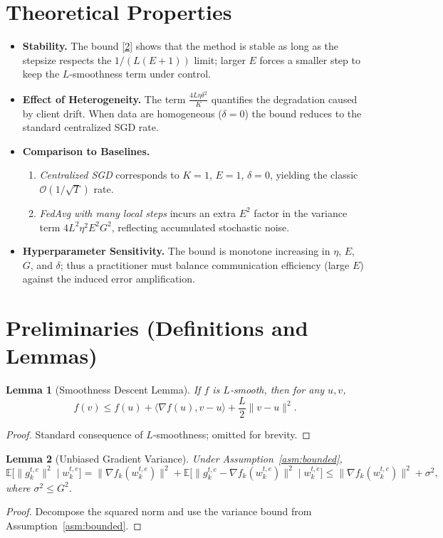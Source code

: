 \documentclass{article}
\newtheorem{lemma}{Lemma}
\begin{document}
\section*{Theoretical Properties}
\begin{itemize}[leftmargin=*]
\item \textbf{Stability.} The bound \eqref{2} shows that the method is stable as long as the stepsize respects the $1/(L(E+1))$ limit; larger $E$ forces a smaller step to keep the $L$‑smoothness term under control.
\item \textbf{Effect of Heterogeneity.} The term $\frac{4L\eta\delta^2}{K}$ quantifies the degradation caused by client drift. When data are homogeneous ($\delta=0$) the bound reduces to the standard centralized SGD rate.
\item \textbf{Comparison to Baselines.}
    \begin{enumerate}
        \item \emph{Centralized SGD} corresponds to $K=1$, $E=1$, $\delta=0$, yielding the classic $\mathcal{O}(1/\sqrt{T})$ rate.
        \item \emph{FedAvg with many local steps} incurs an extra $E^2$ factor in the variance term $4L^2\eta^2E^2G^2$, reflecting accumulated stochastic noise.
    \end{enumerate}
\item \textbf{Hyperparameter Sensitivity.} The bound is monotone increasing in $\eta$, $E$, $G$, and $\delta$; thus a practitioner must balance communication efficiency (large $E$) against the induced error amplification.
\end{itemize}

\section*{Preliminaries (Definitions and Lemmas)}
\begin{lemma}[Smoothness Descent Lemma]\label{lem:smooth}
If $f$ is $L$‑smooth, then for any $u,v$,
\[
f(v)\le f(u)+\langle\nabla f(u),v-u\rangle+\frac{L}{2}\|v-u\|^2.
\]
\end{lemma}
\begin{proof}
Standard consequence of $L$‑smoothness; omitted for brevity. \qedhere
\end{proof}

\begin{lemma}[Unbiased Gradient Variance]\label{lem:var}
Under Assumption~\ref{asm:bounded},
\[
\mathbb{E}\!\big[\|g_{k}^{t,e}\|^2\mid w_{k}^{t,e}\big]
= \|\nabla f_k(w_{k}^{t,e})\|^2
+ \mathbb{E}\!\big[\|g_{k}^{t,e}-\nabla f_k(w_{k}^{t,e})\|^2\mid w_{k}^{t,e}\big]
\le \|\nabla f_k(w_{k}^{t,e})\|^2+ \sigma^2,
\]
where $\sigma^2\le G^2$.
\end{lemma}
\begin{proof}
Decompose the squared norm and use the variance bound from Assumption~\ref{asm:bounded}. \qedhere
\end{proof}
\end{document}
